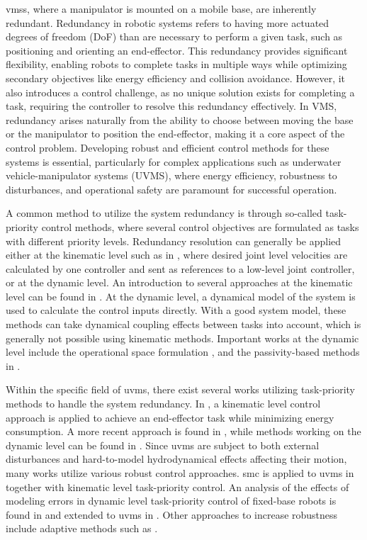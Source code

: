 \documentclass[../main.tex]{subfiles}
\begin{document}
\Glspl{vms}, where a manipulator is mounted on a mobile base, are inherently redundant. Redundancy in robotic systems refers to having more actuated degrees of freedom (DoF) than are necessary to perform a given task, such as positioning and orienting an end-effector. This redundancy provides significant flexibility, enabling robots to complete tasks in multiple ways while optimizing secondary objectives like energy efficiency and collision avoidance. However, it also introduces a control challenge, as no unique solution exists for completing a task, requiring the controller to resolve this redundancy effectively. In VMS, redundancy arises naturally from the ability to choose between moving the base or the manipulator to position the end-effector, making it a core aspect of the control problem. Developing robust and efficient control methods for these systems is essential, particularly for complex applications such as underwater vehicle-manipulator systems (UVMS), where energy efficiency, robustness to disturbances, and operational safety are paramount for successful operation.

A common method to utilize the system redundancy is through so-called task-priority control methods, where several control objectives are formulated as tasks with different priority levels. Redundancy resolution can generally be applied either at the kinematic level such as in \cite{Chiaverini1997}, where desired joint level velocities are calculated by one controller and sent as references to a low-level joint controller, or at the dynamic level. An introduction to several approaches at the kinematic level can be found in \cite{antonelli2009}. At the dynamic level, a dynamical model of the system is used to calculate the control inputs directly. With a good system model, these methods can take dynamical coupling effects between tasks into account, which is generally not possible using kinematic methods. Important works at the dynamic level include the operational space formulation \cite{Khatib1987}, and the passivity-based methods in \cite{Ott2015, Dietrich2020}.

Within the specific field of \gls{uvms}, there exist several works utilizing task-priority methods to handle the system redundancy. In \cite{antonelli1998}, a kinematic level control approach is applied to achieve an end-effector task while minimizing energy consumption. A more recent approach is found in \cite{Simetti2018}, while methods working on the dynamic level can be found in \cite{Brantner2021,WrzosKaminska2024}. Since \gls{uvms} are subject to both external disturbances and hard-to-model hydrodynamical effects affecting their motion, many works utilize various robust control approaches. \Gls{smc} is applied to \gls{uvms} in \cite{Dai2020,Iversflaten2022} together with kinematic level task-priority control. An analysis of the effects of modeling errors in dynamic level task-priority control of fixed-base robots is found in \cite{DiLillo2021} and extended to \gls{uvms} in \cite{IversflatenSaeboe2023}. Other approaches to increase robustness include adaptive methods such as \cite{sarkar1999}.
\end{document}
